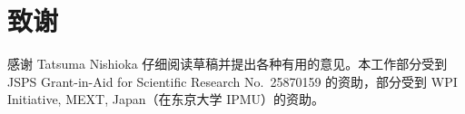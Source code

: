 
\section*{致谢}

感谢 Tatsuma Nishioka 仔细阅读草稿并提出各种有用的意见。本工作部分受到
JSPS Grant-in-Aid for Scientific Research No.\ 25870159 的资助，部分受到
WPI Initiative, MEXT, Japan（在东京大学 IPMU）的资助。
